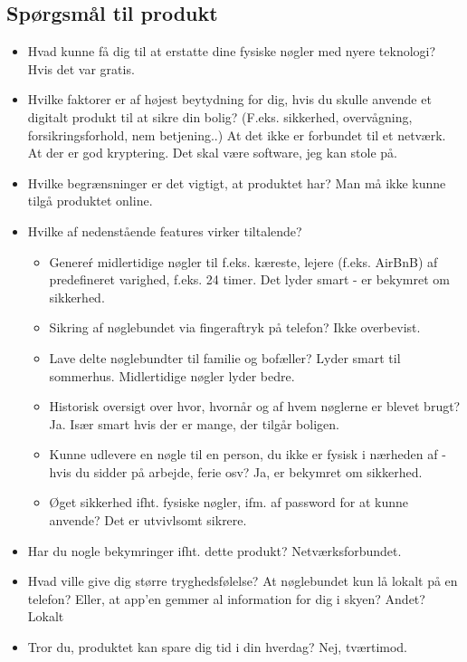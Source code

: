 \documentclass[a4paper,10pt]{article}
\begin{document}
\subsection{Spørgsmål til produkt}
\begin{itemize}
    \item Hvad kunne få dig til at erstatte dine fysiske nøgler med nyere teknologi? Hvis det var gratis. 
    \item Hvilke faktorer er af højest beytydning for dig, hvis du skulle anvende et digitalt produkt til at sikre din bolig? (F.eks. sikkerhed, overvågning, forsikringsforhold, nem betjening..) At det ikke er forbundet til et netværk. At der er god kryptering. Det skal være software, jeg kan stole på. 
    \item Hvilke begrænsninger er det vigtigt, at produktet har? Man må ikke kunne tilgå produktet online. 
    \item Hvilke af nedenstående features virker tiltalende? 
    \begin{itemize}
        \item Genereŕ midlertidige nøgler til f.eks. kæreste, lejere (f.eks. AirBnB) af predefineret varighed, f.eks. 24 timer. Det lyder smart - er bekymret om sikkerhed. 
        \item Sikring af nøglebundet via fingeraftryk på telefon? Ikke overbevist. 
        \item Lave delte nøglebundter til familie og bofæller? Lyder smart til sommerhus. Midlertidige nøgler lyder bedre.
        \item Historisk oversigt over hvor, hvornår og af hvem nøglerne er blevet brugt? Ja. Især smart hvis der er mange, der tilgår boligen.
        \item Kunne udlevere en nøgle til en person, du ikke er fysisk i nærheden af - hvis du sidder på arbejde, ferie osv? Ja, er bekymret om sikkerhed.
        \item Øget sikkerhed ifht. fysiske nøgler, ifm. af password for at kunne anvende? Det er utvivlsomt sikrere. 
    \end{itemize}
    \item Har du nogle bekymringer ifht. dette produkt? Netværksforbundet. 
    \item Hvad ville give dig større tryghedsfølelse? At nøglebundet kun lå lokalt på en telefon? Eller, at app'en gemmer al information for dig i skyen? Andet? Lokalt
    \item Tror du, produktet kan spare dig tid i din hverdag? Nej, tværtimod. 
\end{itemize}
\end{document}
